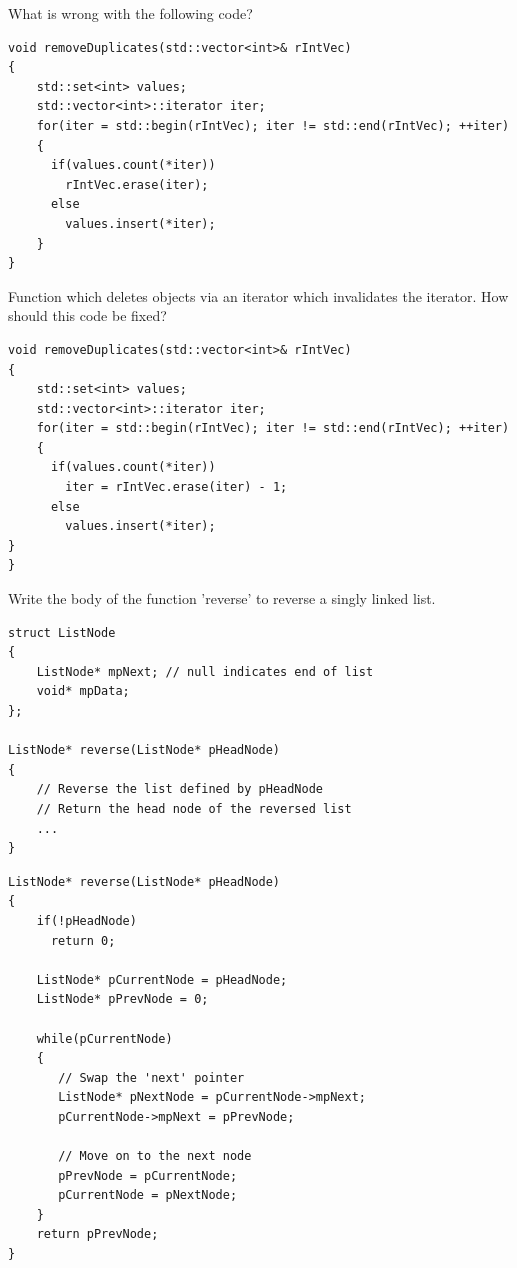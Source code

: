\documentclass[answers]{exam}
\begin{document}
\begin{questions}
\question What is wrong with the following code?
\begin{lstlisting}
void removeDuplicates(std::vector<int>& rIntVec)
{
    std::set<int> values;
    std::vector<int>::iterator iter;
    for(iter = std::begin(rIntVec); iter != std::end(rIntVec); ++iter)
    {
      if(values.count(*iter))
        rIntVec.erase(iter);
      else
        values.insert(*iter);
    }
}
\end{lstlisting}
\begin{solution}[.2in]
Function which deletes objects via an iterator which invalidates the iterator. How should this code be fixed?
\begin{lstlisting}
void removeDuplicates(std::vector<int>& rIntVec)
{
    std::set<int> values;
    std::vector<int>::iterator iter;
    for(iter = std::begin(rIntVec); iter != std::end(rIntVec); ++iter)
    {
      if(values.count(*iter))
        iter = rIntVec.erase(iter) - 1;
      else
        values.insert(*iter);
}
}
\end{lstlisting}
\end{solution}

\question Write the body of the function 'reverse' to reverse a singly linked list.
\begin{lstlisting}
struct ListNode
{
    ListNode* mpNext; // null indicates end of list
    void* mpData;
};

ListNode* reverse(ListNode* pHeadNode)
{
    // Reverse the list defined by pHeadNode
    // Return the head node of the reversed list
    ...
}
\end{lstlisting}
\begin{solution}[.2in]
\begin{lstlisting}
ListNode* reverse(ListNode* pHeadNode)
{
    if(!pHeadNode)
      return 0;

    ListNode* pCurrentNode = pHeadNode;
    ListNode* pPrevNode = 0;

    while(pCurrentNode)
    {
       // Swap the 'next' pointer
       ListNode* pNextNode = pCurrentNode->mpNext;
       pCurrentNode->mpNext = pPrevNode;

       // Move on to the next node
       pPrevNode = pCurrentNode;
       pCurrentNode = pNextNode;
    }
    return pPrevNode;
}
\end{lstlisting}
\end{solution}


\end{questions}
\end{document}

